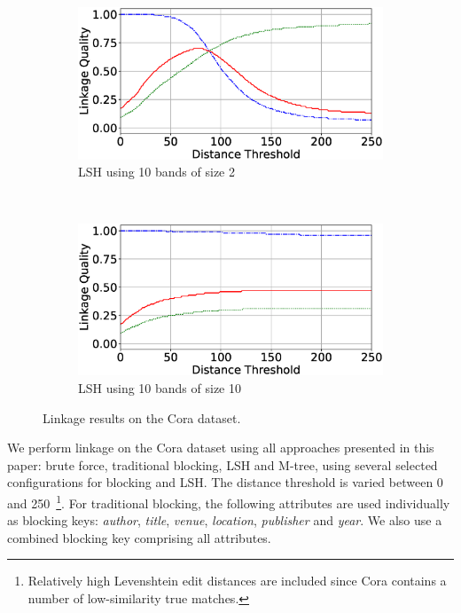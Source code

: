 \documentclass{llncs}
\begin{document}
\begin{figure}
\begin{subfigure}{.47\textwidth}
  \centering
\includegraphics[width=\textwidth]{figures/plotLQ-cora-lsh-10-2}
\vspace{-6mm}
\caption{LSH using 10 bands of size 2}
\end{subfigure}%
~~
\begin{subfigure}{.47\textwidth}
  \centering
\includegraphics[width=\textwidth]{figures/plotLQ-cora-lsh-10-10}
\vspace{-6mm}
\caption{LSH using 10 bands of size 10}
\end{subfigure}
\caption{Linkage results on the Cora dataset.}
\label{cora-quality}
\end{figure}

We perform linkage on the Cora dataset using all approaches presented in
this paper: brute force, traditional blocking, LSH and M-tree, using
several selected configurations for blocking and LSH. The distance
threshold is varied between 0 and 250~\footnote{Relatively high
Levenshtein edit distances are included since Cora contains a number of
low-similarity true matches.}. For traditional blocking, the following
attributes are used individually as blocking keys: \emph{author},
\emph{title}, \emph{venue}, \emph{location}, \emph{publisher} and
\emph{year}. We also use a combined blocking key comprising all
attributes.
\end{document}
